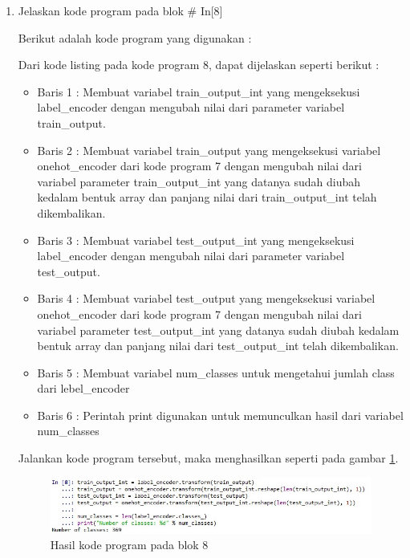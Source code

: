 \begin{enumerate}
\item Jelaskan kode program pada blok \# In[8]
	\par Berikut adalah kode program yang digunakan :
	
	\par Dari kode listing pada kode program 8, dapat dijelaskan seperti berikut :
	\begin{itemize}
	\item Baris 1	: Membuat variabel train\_output\_int yang mengeksekusi label\_encoder dengan mengubah nilai dari parameter variabel train\_output.
	\item Baris 2	: Membuat variabel train\_output yang mengeksekusi variabel onehot\_encoder dari kode program 7 dengan mengubah nilai dari variabel parameter train\_output\_int yang datanya sudah diubah kedalam bentuk array dan panjang nilai dari train\_output\_int telah dikembalikan.
	\item Baris 3	: Membuat variabel test\_output\_int yang mengeksekusi label\_encoder dengan mengubah nilai dari parameter variabel test\_output.
	\item Baris 4	: Membuat variabel test\_output yang mengeksekusi variabel onehot\_encoder dari kode program 7 dengan mengubah nilai dari variabel parameter test\_output\_int yang datanya sudah diubah kedalam bentuk array dan panjang nilai dari test\_output\_int telah dikembalikan.
	\item Baris 5	: Membuat variabel num\_classes untuk mengetahui jumlah class dari lebel\_encoder
	\item Baris 6	: Perintah print digunakan untuk memunculkan hasil dari variabel num\_classes
	\end{itemize}
	\par Jalankan kode program tersebut, maka menghasilkan seperti pada gambar \ref{andri8}.
		\begin{figure}[!hbtp]
		\centering
		\includegraphics[scale=0.5]{figures/chapter7/andri8.jpg}
		\caption{Hasil kode program pada blok 8}
		\label{andri8}
		\end{figure}
		

\end{enumerate}
